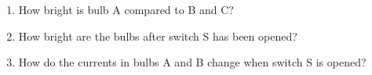 \begin{enumerate}[noitemsep, label=\textbf{\arabic*}. ]
\begin{figure}[H]
\begin{center}
      \vspace{2pt}
    \vspace{.1in}
    
    \end{center}

 \end{figure}   

    \addtocounter{footnote}{-0}
    \label{m38776*id68549}\begin{enumerate}[noitemsep, label=\textbf{\alph*}. ] 
            \label{m38776*uid101}\item How bright is bulb A compared to B and C?
\label{m38776*uid102}\item How bright are the bulbs after switch S has been opened?
\label{m38776*uid103}\item How do the currents in bulbs A and B change when switch S is opened?

    
      
    
    \setlength\mytablespace{6\tabcolsep}
    \addtolength\mytablespace{4\arrayrulewidth}
    \setlength\mytablewidth{\linewidth}
        
    
    \setlength\mytableroom{\mytablewidth}
    \addtolength\mytableroom{-\mytablespace}
    
    \setlength\myfixedwidth{0pt}
    \setlength\mystarwidth{\mytableroom}
        \addtolength\mystarwidth{-\myfixedwidth}
        \divide{}
        
    
\end{enumerate}
\end{enumerate}
